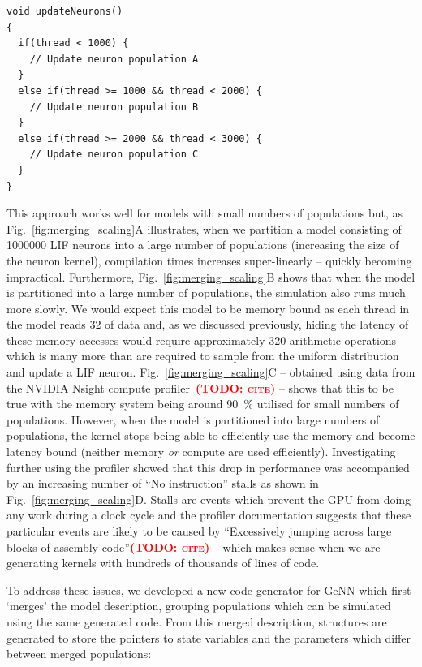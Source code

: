 \documentclass[9pt,twocolumn,twoside,lineno]{pnas-new}
\newcommand{\todo}[1]{\textbf{\textsc{\textcolor{red}{(TODO: #1)}}}}
\begin{document}
\begin{lstlisting}
void updateNeurons()
{
  if(thread < 1000) {
    // Update neuron population A
  }
  else if(thread >= 1000 && thread < 2000) {
    // Update neuron population B
  }
  else if(thread >= 2000 && thread < 3000) {
    // Update neuron population C
  }
}

\end{lstlisting}

This approach works well for models with small numbers of populations but, as Fig.~\ref{fig:merging_scaling}A illustrates, when we partition a model consisting of \num{1000000} LIF neurons into a large number of populations (increasing the size of the neuron kernel), compilation times increases super-linearly -- quickly becoming impractical.
Furthermore, Fig.~\ref{fig:merging_scaling}B shows that when the model is partitioned into a large number of populations, the simulation also runs much more slowly.
We would expect this model to be memory bound as each thread in the model reads \SI{32}{\byte} of data and, as we discussed previously, hiding the latency of these memory accesses would require approximately 320 arithmetic operations which is many more than are required to sample from the uniform distribution and update a LIF neuron.
Fig.~\ref{fig:merging_scaling}C -- obtained using data from the NVIDIA Nsight compute profiler~\todo{cite} -- shows that this to be true with the memory system being around \SI{90}{\percent} utilised for small numbers of populations.
However, when the model is partitioned into large numbers of populations, the kernel stops being able to efficiently use the memory and become latency bound (neither memory \emph{or} compute are used efficiently).
Investigating further using the profiler showed that this drop in performance was accompanied by an increasing number of ``No instruction'' stalls as shown in Fig.~\ref{fig:merging_scaling}D.
Stalls are events which prevent the GPU from doing any work during a clock cycle and the profiler documentation suggests that these particular events are likely to be caused by ``Excessively jumping across large blocks of assembly code''\todo{cite} -- which makes sense when we are generating kernels with hundreds of thousands of lines of code.

To address these issues, we developed a new code generator for GeNN which first `merges' the model description, grouping populations which can be simulated using the same generated code.
From this merged description, structures are generated to store the pointers to state variables and the parameters which differ between merged populations:
\end{document}
